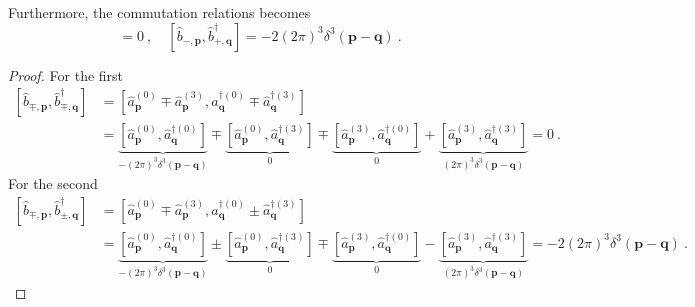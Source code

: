     Furthermore, the commutation relations becomes 
    \begin{equation*}
        [\hat b_{\mp, \mathbf p}, \hat b_{\mp, \mathbf q}^\dagger] = 0 ~, \quad [\hat b_{-, \mathbf p}, \hat b_{+, \mathbf q}^\dagger] = - 2 (2\pi)^3 \delta^3 (\mathbf p - \mathbf q) ~.
    \end{equation*}
    \begin{proof}
        For the first 
        \begin{equation*}
        \begin{aligned}
            [\hat b_{\mp, \mathbf p}, \hat b_{\mp, \mathbf q}^\dagger] & = [\hat a^{(0)}_{\mathbf p} \mp \hat a^{(3)}_{\mathbf p}, \hat a^{\dagger(0)}_{\mathbf q} \mp \hat a^{\dagger(3)}_{\mathbf q}] \\ & = \underbrace{[\hat a^{(0)}_{\mathbf p} , \hat a^{\dagger(0)}_{\mathbf q}]}_{-(2\pi)^3 \delta^3 (\mathbf p - \mathbf q)} \mp \underbrace{[\hat a^{(0)}_{\mathbf p} , \hat a^{\dagger(3)}_{\mathbf q}] }_0 \mp \underbrace{[\hat a^{(3)}_{\mathbf p}, \hat a^{\dagger(0)}_{\mathbf q}]}_0 + \underbrace{[\hat a^{(3)}_{\mathbf p}, \hat a^{\dagger(3)}_{\mathbf q}]}_{(2\pi)^3 \delta^3 (\mathbf p - \mathbf q)} = 0 ~.
        \end{aligned}
        \end{equation*}
        For the second 
        \begin{equation*}
        \begin{aligned}
            [\hat b_{\mp, \mathbf p}, \hat b_{\pm, \mathbf q}^\dagger] & = [\hat a^{(0)}_{\mathbf p} \mp \hat a^{(3)}_{\mathbf p}, \hat a^{\dagger(0)}_{\mathbf q} \pm \hat a^{\dagger(3)}_{\mathbf q}] \\ & = \underbrace{[\hat a^{(0)}_{\mathbf p} , \hat a^{\dagger(0)}_{\mathbf q}]}_{-(2\pi)^3 \delta^3 (\mathbf p - \mathbf q)} \pm \underbrace{[\hat a^{(0)}_{\mathbf p} , \hat a^{\dagger(3)}_{\mathbf q}] }_0 \mp \underbrace{[\hat a^{(3)}_{\mathbf p}, \hat a^{\dagger(0)}_{\mathbf q}]}_0 - \underbrace{[\hat a^{(3)}_{\mathbf p}, \hat a^{\dagger(3)}_{\mathbf q}]}_{(2\pi)^3 \delta^3 (\mathbf p - \mathbf q)} = - 2 (2\pi)^3 \delta^3 (\mathbf p - \mathbf q)  ~.
        \end{aligned}
        \end{equation*}
    \end{proof}

